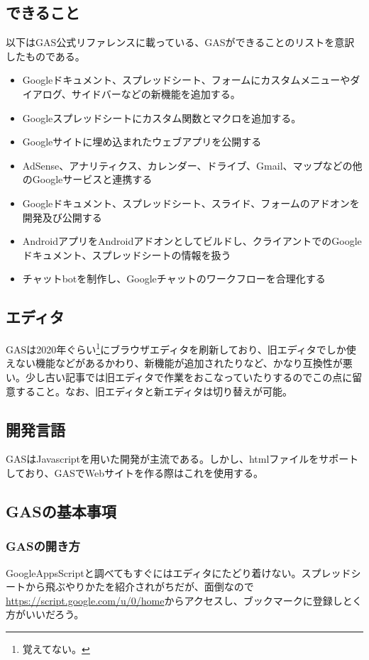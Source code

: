 \documentclass[dvipdfmx,jb5]{jreport}
\begin{document}
\subsection{できること}
以下はGAS公式リファレンスに載っている、GASができることのリストを意訳したものである。
\begin{itemize}
      \item Googleドキュメント、スプレッドシート、フォームにカスタムメニューやダイアログ、サイドバーなどの新機能を追加する。
      \item Googleスプレッドシートにカスタム関数とマクロを追加する。
      \item Googleサイトに埋め込まれたウェブアプリを公開する
      \item AdSense、アナリティクス、カレンダー、ドライブ、Gmail、マップなどの他のGoogleサービスと連携する
      \item Googleドキュメント、スプレッドシート、スライド、フォームのアドオンを開発及び公開する
      \item AndroidアプリをAndroidアドオンとしてビルドし、クライアントでのGoogleドキュメント、スプレッドシートの情報を扱う
      \item チャットbotを制作し、Googleチャットのワークフローを合理化する
\end{itemize}
\subsection{エディタ}
GASは2020年ぐらい\footnote{覚えてない。}にブラウザエディタを刷新しており、旧エディタでしか使えない機能などがあるかわり、新機能が追加されたりなど、かなり互換性が悪い。少し古い記事では旧エディタで作業をおこなっていたりするのでこの点に留意すること。なお、旧エディタと新エディタは切り替えが可能。
\subsection{開発言語}
GASはJavascriptを用いた開発が主流である。しかし、htmlファイルをサポートしており、GASでWebサイトを作る際はこれを使用する。
\subsection{GASの基本事項}
\subsubsection{GASの開き方}
GoogleAppsScriptと調べてもすぐにはエディタにたどり着けない。スプレッドシートから飛ぶやりかたを紹介されがちだが、面倒なので\url{https://script.google.com/u/0/home}からアクセスし、ブックマークに登録しとく方がいいだろう。
\end{document}
